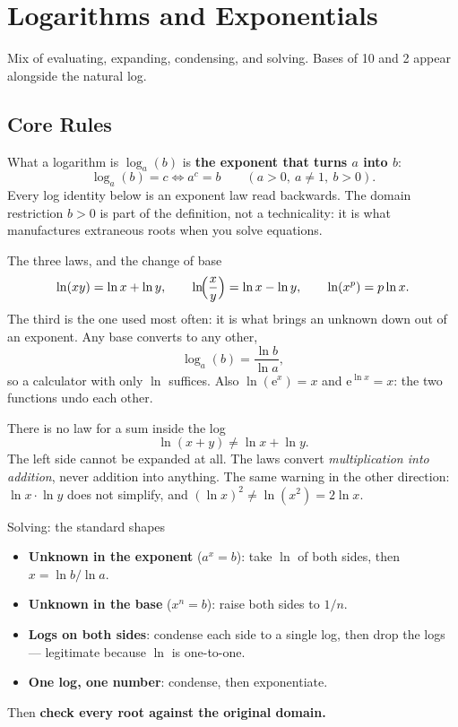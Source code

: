 \chapter{Logarithms and Exponentials}

Mix of evaluating, expanding, condensing, and solving. Bases of 10 and 2
appear alongside the natural log.

\section{Core Rules}

\begin{rulebox}{What a logarithm is}
$\log_{a}(b)$ is \textbf{the exponent that turns $a$ into $b$}:
\[
  \log_{a}(b)=c\iff a^{c}=b\qquad (a>0,\ a\neq1,\ b>0).
\]
Every log identity below is an exponent law read backwards. The domain
restriction $b>0$ is part of the definition, not a technicality: it is what
manufactures extraneous roots when you solve equations.
\end{rulebox}

\begin{rulebox}{The three laws, and the change of base}
\[
  \ln(xy)=\ln x+\ln y,\qquad
  \ln\!\Bigl(\frac{x}{y}\Bigr)=\ln x-\ln y,\qquad
  \ln(x^{p})=p\ln x .
\]
The third is the one used most often: it is what brings an unknown down out of an
exponent. Any base converts to any other,
\[
  \log_{a}(b)=\frac{\ln b}{\ln a},
\]
so a calculator with only $\ln$ suffices. Also $\ln(\mathrm{e}^{x})=x$ and
$\mathrm{e}^{\ln x}=x$: the two functions undo each other.
\end{rulebox}

\begin{rulebox}{There is no law for a sum inside the log}
\[
  \ln(x+y)\neq\ln x+\ln y .
\]
The left side cannot be expanded at all. The laws convert
\emph{multiplication into addition}, never addition into anything. The same
warning in the other direction: $\ln x\cdot\ln y$ does not simplify, and
$(\ln x)^{2}\neq\ln(x^{2})=2\ln x$.
\end{rulebox}

\begin{rulebox}{Solving: the standard shapes}
\begin{itemize}[leftmargin=1.6em,itemsep=0.3ex]
  \item \textbf{Unknown in the exponent} ($a^{x}=b$): take $\ln$ of both
        sides, then $x=\ln b/\ln a$.
  \item \textbf{Unknown in the base} ($x^{n}=b$): raise both sides to
        $1/n$.
  \item \textbf{Logs on both sides}: condense each side to a single log,
        then drop the logs --- legitimate because $\ln$ is one-to-one.
  \item \textbf{One log, one number}: condense, then exponentiate.
\end{itemize}
Then \textbf{check every root against the original domain.}
\end{rulebox}

